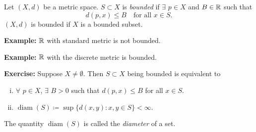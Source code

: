 \documentclass[10pt,aspectratio=149]{beamer}
\begin{document}
\begin{frame}

\begin{definition}
Let $(X,d)$ be a metric space.  $S \subset X$ is 
\emph{bounded} if $\exists$ $p \in X$ and
$B \in {\mathbb{R}}$ such that
\begin{equation*}
d(p,x) \leq B \quad \text{for all } x \in S.
\end{equation*}
\pause
$(X,d)$ is bounded if $X$ is a bounded subset.
\end{definition}

\pause
\textbf{Example:}
${\mathbb{R}}$ with standard metric is not bounded.

\pause
\medskip

\textbf{Example:}
${\mathbb{R}}$ with the discrete metric is bounded.

\pause
\medskip

\textbf{Exercise:}
Suppose $X \not= \emptyset$.
Then $S \subset X$ being bounded is equivalent to
\begin{enumerate}[(i)]
\item
\pause
$\forall$ $p \in X$, $\exists$ $B > 0$ such that $d(p,x) \leq B$ for
all $x \in S$.
\item
\pause
$\operatorname{diam}(S) \coloneqq \sup \bigl\{ d(x,y) : x,y \in S \bigr\} < \infty$.
\end{enumerate}

\pause
The quantity $\operatorname{diam}(S)$ is called the
\emph{diameter} of a set.

\end{frame}

%
%
%
%
\end{document}
